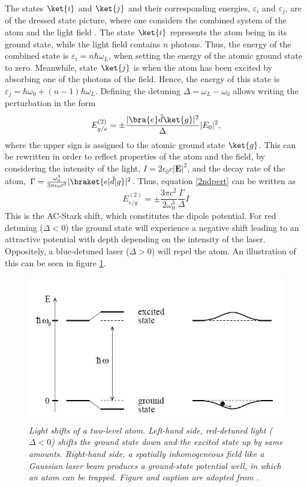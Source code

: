 The states $\ket{i}$ and $\ket{j}$ and their corresponding energies, $\varepsilon_i$ and $\varepsilon_j$, are of the dressed state picture, where one considers the combined system of the atom and the light field \cite{cohen1992atom}. The state $\ket{i}$ represents the atom being in its ground state, while the light field contains $n$ photons. Thus, the energy of the combined state is $\varepsilon_i = n \hbar \omega_L$, when setting the energy of the atomic ground state to zero. Meanwhile, state $\ket{j}$ is when the atom has been excited by absorbing one of the photons of the field. Hence, the energy of this state is $\varepsilon_j = \hbar \omega_0 + (n-1) \hbar \omega_L$. Defining the detuning $\Delta = \omega_L - \omega_0$ allows writing the perturbation in the form
\begin{equation}
	E_{g/e}^{(2)}=\pm  \frac{ |\bra{e}\hat{d}\ket{g}|^2}{\Delta} |E_0|^2,
	\label{2ndpert}
\end{equation}
where the upper sign is assigned to the atomic ground state $\ket{g}$. This can be rewritten in order to reflect properties of the atom and the field, by considering the intensity of the light, $I = 2 \epsilon_0 c |\boldsymbol{E}|^2 $, and the decay rate of the atom, $\Gamma = \frac{\omega_{0}^3}{3 \pi \epsilon_0 c^3} |\braket{e | \hat{d} | g}|^2$. Thus, equation \eqref{2ndpert} can be written as \cite{grimm} 
\begin{equation}
	E_{e/g}^{(2)}=\pm \frac{3 \pi c^2}{2 \omega_{0}^3} \frac{\Gamma}{\Delta}I
	\label{eq:dipolepot}
\end{equation}
This is the AC-Stark shift, which constitutes the dipole potential. For red detuning ($\Delta < 0$) the ground state will experience a negative shift leading to an attractive potential with depth depending on the intensity of the laser. Oppositely, a blue-detuned laser ($\Delta > 0$) will repel the atom. An illustration of this can be seen in figure \ref{fig:ac_stark}.
\begin{figure}[!h]
	\centering
	\includegraphics[width=0.5\columnwidth]{Figures/acstark.JPG} 
	\caption{\textit{Light shifts of a two-level atom. Left-hand side,
		red-detuned light ($\Delta < 0$) shifts the ground state down and the
		excited state up by same amounts. Right-hand side, a spatially
		inhomogeneous field like a Gaussian laser beam produces a
		ground-state potential well, in which an atom can be trapped. Figure and 		caption are adopted from \cite{grimm}.}}
	\label{fig:ac_stark} 
\end{figure}

